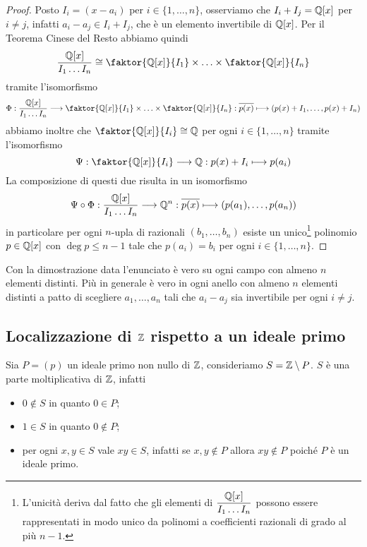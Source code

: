 \documentclass[11pt]{scrartcl}
\begin{document}
\begin{proof}
    Posto $I_i = (x - a_i)$ per $i \in \{1, \ldots, n\}$, osserviamo che 
    $I_i + I_j = \mathbb Q[x]$ per $i \neq j$, infatti $a_i - a_j \in I_i + I_j$, 
    che è un elemento invertibile di $\mathbb Q[x]$. Per il Teorema Cinese del Resto
    abbiamo quindi
    \[
        \frac{\QQ[x]}{I_1\ldots I_n} \cong \faktor{\QQ[x]}{I_1}\times 
        \ldots \times \faktor{\QQ[x]}{I_n}
    \]
    tramite l'isomorfismo
    \[
        \Phi: \frac{\QQ[x]}{I_1\ldots I_n} \longrightarrow \faktor{\QQ[x]}{I_1}\times 
        \ldots \times \faktor{\QQ[x]}{I_n}: \overline{p(x)}\longmapsto
        (p(x) + I_1, \ldots, p(x) + I_n)
    \]
    abbiamo inoltre che $\faktor{\QQ[x]}{I_i} \cong \QQ$ per ogni $i \in \{1, \ldots, n\}$
    tramite l'isomorfismo
    \[
        \Psi: \faktor{\QQ[x]}{I_i} \longrightarrow \QQ: p(x) + I_i \longmapsto p(a_i)
    \]
    La composizione di questi due risulta in un isomorfismo
    \[
        \Psi\circ\Phi: \frac{\mathbb Q[x]}{I_1\ldots I_n}\longrightarrow \mathbb Q^n:
        \overline{p(x)}\longmapsto (p(a_1), \ldots, p(a_n))
    \]
    in particolare per ogni $n$-upla di razionali $(b_1, \ldots, b_n)$ esiste
    un unico\footnote{
        L'unicità deriva dal fatto che gli elementi di $\displaystyle\frac{\mathbb Q[x]}{I_1\ldots I_n}$
        possono essere rappresentati in modo unico da polinomi a coefficienti 
        razionali di grado al più $n - 1$.
    } polinomio $p \in \mathbb Q[x]$ con $\deg p \leq n - 1$ tale che 
    $p(a_i) = b_i$ per ogni $i \in \{1, \ldots, n\}$.
\end{proof}

\begin{remark}
    Con la dimostrazione data l'enunciato è vero su ogni campo con almeno 
    $n$ elementi distinti. Più in generale è vero in ogni anello con almeno $n$
    elementi distinti a patto di scegliere $a_1, \ldots, a_n$ tali che $a_i - a_j$
    sia invertibile per ogni $i \neq j$.
\end{remark}

\newpage

\subsection{Localizzazione di $\mathbb Z$ rispetto a un ideale primo}

Sia $P = (p)$ un ideale primo non nullo di $\mathbb Z$, consideriamo $S = \mathbb Z \setminus P$.
$S$ è una parte moltiplicativa di $\mathbb Z$, infatti
\begin{itemize}
    \item $0 \notin S$ in quanto $0 \in P$;
    \item $1 \in S$ in quanto $0 \notin P$;
    \item per ogni $x, y \in S$ vale $xy \in S$, infatti se $x, y \notin P$
    allora $xy \notin P$ poiché $P$ è un ideale primo.
\end{itemize}
\end{document}
